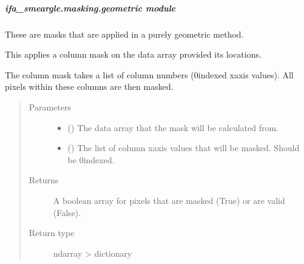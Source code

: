 \documentclass[letterpaper,10pt,english]{sphinxmanual}
\begin{document}
\subparagraph{ifa\_smeargle.masking.geometric module}
\label{\detokenize{docstrings/ifa_smeargle.masking.geometric:module-ifa_smeargle.masking.geometric}}\label{\detokenize{docstrings/ifa_smeargle.masking.geometric:ifa-smeargle-masking-geometric-module}}\label{\detokenize{docstrings/ifa_smeargle.masking.geometric::doc}}
These are masks that are applied in a purely geometric method.

\begin{fulllineitems}
\label{\detokenize{docstrings/ifa_smeargle.masking.geometric:ifa_smeargle.masking.geometric.mask_columns}}
This applies a column mask on the data array provided its
locations.

The column mask takes a list of column numbers (0\sphinxhyphen{}indexed x\sphinxhyphen{}axis
values). All pixels within these columns are then masked.
\begin{quote}\begin{description}
\item[{Parameters}] \leavevmode\begin{itemize}
\item {} 
 () \textendash{} The data array that the mask will be calculated from.

\item {} 
 () \textendash{} The list of column x\sphinxhyphen{}axis values that will be masked. Should
be 0\sphinxhyphen{}indexed.

\end{itemize}

\item[{Returns}] \leavevmode
{} \textendash{} A boolean array for pixels that are masked (True) or are
valid (False).

\item[{Return type}] \leavevmode
ndarray \sphinxhyphen{}\textgreater{} dictionary

\end{description}\end{quote}

\end{fulllineitems}
\end{document}
